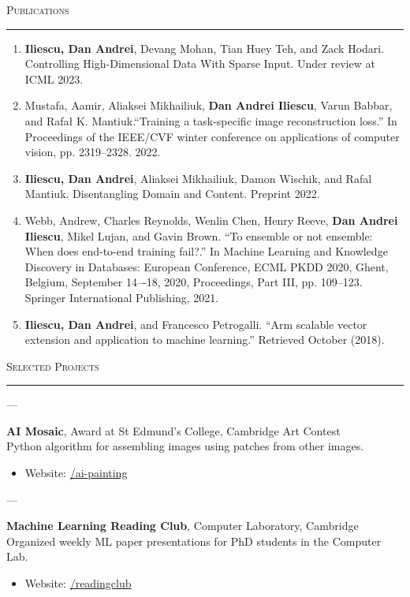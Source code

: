 \documentclass[a4paper]{article}
\newcommand{\entry}[6]{
    \begin{minipage}[t]{.05\textwidth}
        \centering #1
    \end{minipage}
    ---
    \begin{minipage}[t]{.05\textwidth}
        \centering #2
    \end{minipage}
    \hfill
    \begin{minipage}[t]{.85\textwidth}
        \textbf{#3}, #4\\
        #5\\
        \vspace{-1em}
        #6
    \end{minipage}
}
\begin{document}
\newpage

\textsc{\Large Publications}

\rule{\textwidth}{1pt}


\begin{enumerate}[itemsep=1em]
    \item \textbf{Iliescu, Dan Andrei}, Devang Mohan, Tian Huey Teh, and Zack Hodari. Controlling High-Dimensional Data With Sparse Input. Under review at ICML 2023.
    \item Mustafa, Aamir, Aliaksei Mikhailiuk, \textbf{Dan Andrei Iliescu}, Varun Babbar, and Rafał K. Mantiuk.``Training a task-specific image reconstruction loss.'' In Proceedings of the IEEE/CVF winter conference on applications of computer vision, pp. 2319--2328. 2022.
    \item \textbf{Iliescu, Dan Andrei}, Aliaksei Mikhailiuk, Damon Wischik, and Rafal Mantiuk. Disentangling Domain and Content. Preprint 2022.
    \item Webb, Andrew, Charles Reynolds, Wenlin Chen, Henry Reeve, \textbf{Dan Andrei Iliescu}, Mikel Lujan, and Gavin Brown. ``To ensemble or not ensemble: When does end-to-end training fail?.'' In Machine Learning and Knowledge Discovery in Databases: European Conference, ECML PKDD 2020, Ghent, Belgium, September 14–-18, 2020, Proceedings, Part III, pp. 109--123. Springer International Publishing, 2021.
    \item \textbf{Iliescu, Dan Andrei}, and Francesco Petrogalli. ``Arm scalable vector extension and application to machine learning.'' Retrieved October (2018).
\end{enumerate}

\vspace{1em}

\textsc{\Large Selected Projects}

\rule{\textwidth}{1pt}

\entry{2021}{}{AI Mosaic}{Award at St Edmund's College, Cambridge Art Contest}{Python algorithm for assembling images using patches from other images.}{
    \begin{itemize}[leftmargin=*]
        \item Website: \href{https://github.com/Dan-Andrei-Iliescu/ai-painting}{/ai-painting}
    \end{itemize}
}

\entry{2019}{2020}{Machine Learning Reading Club}{Computer Laboratory, Cambridge}{Organized weekly ML paper presentations for PhD students in the Computer Lab.}{
    \begin{itemize}[leftmargin=*]
        \item Website: \href{https://www.cl.cam.ac.uk/research/rainbow/readingclub/}{/readingclub}
    \end{itemize}
}
\end{document}
